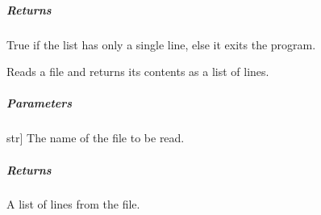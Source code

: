 \documentclass[letterpaper,10pt,english]{sphinxmanual}
\begin{document}
\begin{fulllineitems}
\begin{fulllineitems}
\begin{description}
\end{description}


\subparagraph{Returns}
\label{\detokenize{main.doxygen_management:id22}}\begin{description}
\sphinxAtStartPar
True if the list has only a single line, else it exits the program.

\end{description}

\end{fulllineitems}


\begin{fulllineitems}
\label{\detokenize{main.doxygen_management:main.doxygen_management.file_handler.FileHandler.read_file}}
\pysigstartsignatures
{}
\pysigstopsignatures
\sphinxAtStartPar
Reads a file and returns its contents as a list of lines.


\subparagraph{Parameters}
\label{\detokenize{main.doxygen_management:id23}}\begin{description}
\sphinxlineitem{filename}{[}str{]}
\sphinxAtStartPar
The name of the file to be read.

\end{description}


\subparagraph{Returns}
\label{\detokenize{main.doxygen_management:id24}}\begin{description}
\sphinxAtStartPar
A list of lines from the file.

\end{description}

\end{fulllineitems}



\end{fulllineitems}
\end{document}
